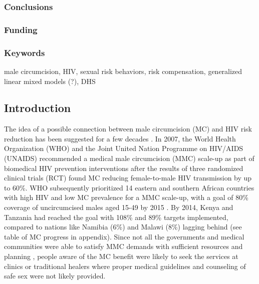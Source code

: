 \documentclass[12pt,]{article}
\begin{document}
\subsubsection{Conclusions}\label{conclusions}

\subsubsection{Funding}\label{funding}

\subsubsection{Keywords}\label{keywords}

male circumcision, HIV, sexual risk behaviors, risk compensation,
generalized linear mixed models (?), DHS

\subsection{Introduction}\label{introduction}

The idea of a possible connection between male circumcision (MC) and HIV
risk reduction has been suggested for a few decades
\cite{Acle86, CameSimo89, Lind88, HalpBail99}. In 2007, the World
Health Organization (WHO) and the Joint United Nation Programme on
HIV/AIDS (UNAIDS) recommended a medical male circumcision (MMC) scale-up
as part of biomedical HIV prevention interventions \cite{WHO07a}
after the results of three randomized clinical trials (RCT)
\cite{AuveTalj05, BailMose07, GrayKigo07} found MC reducing
female-to-male HIV transmission by up to 60\%. WHO subsequently
prioritized 14 eastern and southern African countries with high HIV and
low MC prevalence for a MMC scale-up, with a goal of 80\% coverage of
uncircumcised males aged 15-49 by 2015 \cite{WHO11a}. By 2014, Kenya
and Tanzania had reached the goal with 108\% and 89\% targets
implemented, compared to nations like Namibia (6\%) and Malawi (8\%)
lagging behind \cite{WHO15} (see table of MC progress in appendix).
Since not all the governments and medical communities were able to
satisfy MMC demands with sufficient resources and planning
\cite{CurrNjeu11}, people aware of the MC benefit were likely to
seek the services at clinics or traditional healers where proper medical
guidelines and counseling of safe sex were not likely provided.


\end{document}
